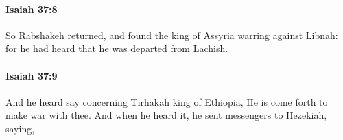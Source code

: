 		\paragraph{Isaiah 37:8} %
			\label{ISAIAH-37-8}

			So Rabshakeh returned, and found the king of Assyria warring against Libnah: for he had heard that he was departed from Lachish.


		\paragraph{Isaiah 37:9} %
			\label{ISAIAH-37-9}

			And he heard say concerning Tirhakah king of Ethiopia, He is come forth to make war with thee. And when he heard it, he sent messengers to Hezekiah, saying,


